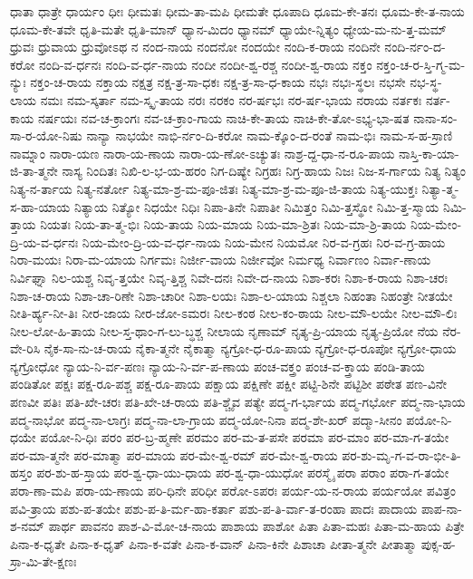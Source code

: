 {ಧಾತಾ
ಧಾತ್ರೇ
ಧಾರ್ಯಂ
ಧೀಃ
ಧೀಮತಃ
ಧೀಮ-ತಾ-ಮಪಿ
ಧೀಮತೇ
ಧೂಪಾದಿ
ಧೂಮ-ಕೇ-ತನಃ
ಧೂಮ-ಕೇ-ತ-ನಾಯ
ಧೂಮ-ಕೇ-ತವೇ
ಧೃತಿ-ಮತೇ
ಧೃತಿ-ಮಾನ್
ಧ್ಯಾನ-ಮಿದಂ
ಧ್ಯಾನಮ್
ಧ್ಯಾಯೇ-ನ್ನಿತ್ಯಂ
ಧ್ಯೇಯ-ಮ-ನು-ತ್ತ-ಮಮ್
ಧ್ರುವಃ
ಧ್ರುವಾಯ
ಧ್ರುವೋಽಥ
ನ
ನಂದ-ನಾಯ
ನಂದನೋ
ನಂದಯೇ
ನಂದಿ-ಕ-ರಾಯ
ನಂದಿನೇ
ನಂದಿ-ರ್ನಂ-ದ-ಕರೋ
ನಂದಿ-ವ-ರ್ಧನಃ
ನಂದಿ-ವ-ರ್ಧ-ನಾಯ
ನಂದೀ
ನಂದೀ-ಶ್ವ-ರಶ್ಚ
ನಂದೀ-ಶ್ವ-ರಾಯ
ನಕ್ತಂ
ನಕ್ತಂ-ಚ-ರ-ಸ್ತಿ-ಗ್ಮ-ಮ-ನ್ಯುಃ
ನಕ್ತಂ-ಚ-ರಾಯ
ನಕ್ತಾಯ
ನಕ್ಷತ್ರ
ನಕ್ಷ-ತ್ರ-ಸಾ-ಧಕಃ
ನಕ್ಷ-ತ್ರ-ಸಾ-ಧ-ಕಾಯ
ನಭಃ
ನಭಃ-ಸ್ಥಲಃ
ನಭಸೇ
ನಭ-ಸ್ಥ-ಲಾಯ
ನಮಃ
ನಮ-ಸ್ಕರ್ತಾ
ನಮ-ಸ್ಕೃ-ತಾಯ
ನರಃ
ನರಕಂ
ನರ-ರ್ಷಭಃ
ನರ-ರ್ಷ-ಭಾಯ
ನರಾಯ
ನರ್ತಕಃ
ನರ್ತ-ಕಾಯ
ನರ್ಷಯಃ
ನವ-ಚ-ಕ್ರಾಂಗಃ
ನವ-ಚ-ಕ್ರಾಂ-ಗಾಯ
ನಾಚಿ-ಕೇ-ತಾಯ
ನಾಚಿ-ಕೇ-ತೋ-ಽಭ್ಯ-ಭಾ-ಷತ
ನಾನಾ-ಸಂ-ಸಾ-ರ-ಯೋ-ನಿಷು
ನಾನ್ಯಾ
ನಾಭಯೇ
ನಾಭಿ-ರ್ನಂ-ದಿ-ಕರೋ
ನಾಮ-ಕ್ಕೊಂ-ದ-ರಂತೆ
ನಾಮ-ಭಿಃ
ನಾಮ-ಸ-ಹ-ಸ್ರಾಣಿ
ನಾಮ್ನಾಂ
ನಾರಾ-ಯಣ
ನಾರಾ-ಯ-ಣಾಯ
ನಾರಾ-ಯ-ಣೋ-ಽಚ್ಯುತಃ
ನಾಶ್ರ-ದ್ದ-ಧಾ-ನ-ರೂ-ಪಾಯ
ನಾಸ್ತಿ-ಕಾ-ಯಾ-ಜಿ-ತಾ-ತ್ಮನೇ
ನಾಸ್ಯ
ನಿಂದಿತಃ
ನಿಖಿ-ಲ-ಭ-ಯ-ಹರಂ
ನಿಗ-ದಿಷ್ಯೇ
ನಿಗ್ರಹಃ
ನಿಗ್ರ-ಹಾಯ
ನಿಜಃ
ನಿಜ-ಸ-ರ್ಗಾಯ
ನಿತ್ಯ
ನಿತ್ಯಂ
ನಿತ್ಯ-ನ-ರ್ತಾಯ
ನಿತ್ಯ-ನರ್ತೋ
ನಿತ್ಯ-ಮಾ-ಶ್ರ-ಮ-ಪೂ-ಜಿತಃ
ನಿತ್ಯ-ಮಾ-ಶ್ರ-ಮ-ಪೂ-ಜಿ-ತಾಯ
ನಿತ್ಯ-ಯುಕ್ತಃ
ನಿತ್ಯಾ-ತ್ಮ-ಸ-ಹಾ-ಯಾಯ
ನಿತ್ಯಾಯ
ನಿತ್ಯೋ
ನಿಧಯೇ
ನಿಧಿಃ
ನಿಪಾ-ತಿನೇ
ನಿಪಾತೀ
ನಿಮಿತ್ತಂ
ನಿಮಿ-ತ್ತಸ್ಥೋ
ನಿಮಿ-ತ್ತ-ಸ್ಮಾಯ
ನಿಮಿ-ತ್ತಾಯ
ನಿಯತಃ
ನಿಯ-ತಾ-ತ್ಮ-ಭಿಃ
ನಿಯ-ತಾಯ
ನಿಯ-ಮಾಯ
ನಿಯ-ಮಾ-ಶ್ರಿತಃ
ನಿಯ-ಮಾ-ಶ್ರಿ-ತಾಯ
ನಿಯ-ಮೇಂ-ದ್ರಿ-ಯ-ವ-ರ್ಧನಃ
ನಿಯ-ಮೇಂ-ದ್ರಿ-ಯ-ವ-ರ್ಧ-ನಾಯ
ನಿಯ-ಮೇನ
ನಿಯಮೋ
ನಿರ-ವ-ಗ್ರಹಃ
ನಿರ-ವ-ಗ್ರ-ಹಾಯ
ನಿರಾ-ಮಯಃ
ನಿರಾ-ಮ-ಯಾಯ
ನಿರ್ಗಮಃ
ನಿರ್ಜೀ-ವಾಯ
ನಿರ್ಜೀವೋ
ನಿರ್ಮಥ್ಯ
ನಿರ್ವಾಣಂ
ನಿರ್ವಾ-ಣಾಯ
ನಿರ್ವಿಘ್ನಾ
ನಿಲ-ಯಶ್ಚ
ನಿವೃ-ತ್ತಯೇ
ನಿವೃ-ತ್ತಿಶ್ಚ
ನಿವೇ-ದನಃ
ನಿವೇ-ದ-ನಾಯ
ನಿಶಾ-ಕರಃ
ನಿಶಾ-ಕ-ರಾಯ
ನಿಶಾ-ಚರಃ
ನಿಶಾ-ಚ-ರಾಯ
ನಿಶಾ-ಚಾ-ರಿಣೇ
ನಿಶಾ-ಚಾರೀ
ನಿಶಾ-ಲಯಃ
ನಿಶಾ-ಲ-ಯಾಯ
ನಿಶ್ಚಲಾ
ನಿಹಂತಾ
ನಿಹಂತ್ರೇ
ನೀತಯೇ
ನೀತಿ-ರ್ಹ್ಯ-ನೀ-ತಿಃ
ನೀರ-ಜಾಯ
ನೀರ-ಜೋ-ಽಮರಃ
ನೀಲ-ಕಂಠ
ನೀಲ-ಕಂ-ಠಾಯ
ನೀಲ-ಮೌ-ಲಯೇ
ನೀಲ-ಮೌ-ಲಿಃ
ನೀಲ-ಲೋ-ಹಿ-ತಾಯ
ನೀಲ-ಸ್ತ-ಥಾಂ-ಗ-ಲು-ಬ್ಧಶ್ಚ
ನೀಲಾಯ
ನೃಣಾಮ್
ನೃತ್ಯ-ಪ್ರಿ-ಯಾಯ
ನೃತ್ಯ-ಪ್ರಿಯೋ
ನೆಯ
ನೆರ-ವೇ-ರಿಸಿ
ನೈಕ-ಸಾ-ನು-ಚ-ರಾಯ
ನೈಕಾ-ತ್ಮನೇ
ನೈಕಾತ್ಮಾ
ನ್ಯಗ್ರೋ-ಧ-ರೂ-ಪಾಯ
ನ್ಯಗ್ರೋ-ಧ-ರೂಪೋ
ನ್ಯಗ್ರೋ-ಧಾಯ
ನ್ಯಗ್ರೋಧೋ
ನ್ಯಾಯ-ನಿ-ರ್ವ-ಪಣಃ
ನ್ಯಾಯ-ನಿ-ರ್ವ-ಪ-ಣಾಯ
ಪಂಚ-ವಕ್ತ್ರಂ
ಪಂಚ-ವ-ಕ್ತ್ರಾಯ
ಪಂಡಿ-ತಾಯ
ಪಂಡಿತೋ
ಪಕ್ಷಃ
ಪಕ್ಷ-ರೂ-ಪಶ್ಚ
ಪಕ್ಷ-ರೂ-ಪಾಯ
ಪಕ್ಷಾಯ
ಪಕ್ಷಿಣೇ
ಪಕ್ಷೀ
ಪಟ್ಟಿ-ಶಿನೇ
ಪಟ್ಟಿಶೀ
ಪಠೇತ
ಪಣ-ವಿನೇ
ಪಣವೀ
ಪತಿಃ
ಪತಿ-ಖೇ-ಚರಃ
ಪತಿ-ಖೇ-ಚ-ರಾಯ
ಪತಿ-ಶ್ಚೈವ
ಪತ್ಯೇ
ಪದ್ಮ-ಗ-ರ್ಭಾಯ
ಪದ್ಮ-ಗರ್ಭೋ
ಪದ್ಮ-ನಾ-ಭಾಯ
ಪದ್ಮ-ನಾಭೋ
ಪದ್ಮ-ನಾ-ಲಾಗ್ರಃ
ಪದ್ಮ-ನಾ-ಲಾ-ಗ್ರಾಯ
ಪದ್ಮ-ಯೋ-ನಿನಾ
ಪದ್ಮ-ಶೇ-ಖರ್
ಪದ್ಮಾ-ಸೀನಂ
ಪಯೋ-ನಿ-ಧಯೇ
ಪಯೋ-ನಿ-ಧಿಃ
ಪರಂ
ಪರ-ಬ್ರ-ಹ್ಮಣೇ
ಪರಮಂ
ಪರ-ಮ-ತ-ಪಸೇ
ಪರಮಾ
ಪರ-ಮಾಂ
ಪರ-ಮಾ-ಗ-ತಯೇ
ಪರ-ಮಾ-ತ್ಮನೇ
ಪರ-ಮಾತ್ಮಾ
ಪರ-ಮಾಯ
ಪರ-ಮೇ-ಶ್ವ-ರಮ್
ಪರ-ಮೇ-ಶ್ವ-ರಾಯ
ಪರ-ಶು-ಮೃ-ಗ-ವ-ರಾ-ಭೀ-ತಿ-ಹಸ್ತಂ
ಪರ-ಶು-ಹ-ಸ್ತಾಯ
ಪರ-ಶ್ವ-ಧಾ-ಯು-ಧಾಯ
ಪರ-ಶ್ವ-ಧಾ-ಯುಧೋ
ಪರಸ್ಮೈ
ಪರಾ
ಪರಾಂ
ಪರಾ-ಗ-ತಯೇ
ಪರಾ-ಣಾ-ಮಪಿ
ಪರಾ-ಯ-ಣಾಯ
ಪರಿ-ಧಿನೇ
ಪರಿಧೀ
ಪರೋ-ಽಪರಃ
ಪರ್ಯ-ಯ-ನ-ರಾಯ
ಪರ್ಯಯೋ
ಪವಿತ್ರಂ
ಪವಿ-ತ್ರಾಯ
ಪಶು-ಪ-ತಯೇ
ಪಶು-ಪ-ತಿ-ರ್ಮ-ಹಾ-ಕರ್ತಾ
ಪಶು-ಪ-ತಿ-ರ್ವಾ-ತ-ರಂಹಾ
ಪಾದಃ
ಪಾದಾಯ
ಪಾಪ-ನಾ-ಶ-ನಮ್
ಪಾರ್ಥ
ಪಾವನಂ
ಪಾಶ-ವಿ-ಮೋ-ಚ-ನಾಯ
ಪಾಶಾಯ
ಪಾಶೋ
ಪಿತಾ
ಪಿತಾ-ಮಹಃ
ಪಿತಾ-ಮ-ಹಾಯ
ಪಿತ್ರೇ
ಪಿನಾ-ಕ-ಧೃತೇ
ಪಿನಾ-ಕ-ಧೃತ್
ಪಿನಾ-ಕ-ವತೇ
ಪಿನಾ-ಕ-ವಾನ್
ಪಿನಾ-ಕಿನೇ
ಪಿಶಾಚಾ
ಪೀತಾ-ತ್ಮನೇ
ಪೀತಾತ್ಮಾ
ಪುಕ್ಸ-ಹ-ಸ್ರಾ-ಮಿ-ತೇ-ಕ್ಷಣಃ
}
